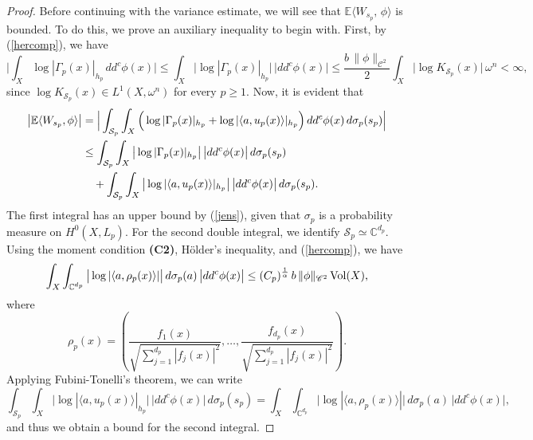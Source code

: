 \documentclass[11pt,leqno,oneside]{amsart}
\numberwithin{equation}{section}
\begin{document}
\begin{proof}
Before continuing with the variance estimate, we will see that \( \mathbb{E}\langle W_{s_{p}}, \, \phi \rangle \) is bounded. To do this, we prove an auxiliary inequality to begin with. First, by (\ref{hercomp}), we have
\begin{equation} \label{jens}
  \Big| \int_{X}{\log{|\Gamma_{p}(x)|_{h_{p}}} \,dd^{c}\phi(x)} \Big| \leq
	\int_{X}{\big|\log{|\Gamma_{p}(x)|_{h_{p}}}\big| \, \big|dd^{c}\phi(x) \big|} \leq \frac{b \, \| \phi \|_{\mathscr{C}^{2}}}{2} \int_{X}{\big|\log{K_{\mathcal{S}_{p}}(x)}\big| \,\omega^{n}} < \infty,
\end{equation}
since \( \log{K_{\mathcal{S}_{p}}(x)} \in L^{1}(X, \omega^{n}) \) for every \( p \geq 1 \). Now, it is evident that
\begin{align} \label{3..6}
	\big{|} \mathbb{E}\langle W_{s_{p}}, \phi \rangle \big{|} &= \Big| \int_{\mathcal{S}_{p}} \int_{X}{\Big(\log{|\Gamma_{p}(x)|_{h_{p}}} + \log{| \langle a, u_{p}(x)\rangle|_{h_{p}}}\Big)} \, dd^{c}\phi(x) \, d\sigma_{p}(s_{p}) \Big| \\ \nonumber 
	&\leq \int_{\mathcal{S}_{p}} \int_{X}{\big|\log{|\Gamma_{p}(x)|_{h_{p}}}\big| \, \big| dd^{c}\phi(x) \big| \, d\sigma_{p}(s_{p})} \\ \nonumber
	&\quad + \int_{\mathcal{S}_{p}} \int_{X}{\big| \log{| \langle a, u_{p}(x)\rangle|_{h_{p}}}\big|} \, \big| dd^{c}\phi(x) \big| \, d\sigma_{p}(s_{p}). \nonumber
\end{align}
 The first integral has an upper bound by (\ref{jens}), given that \(\sigma_{p}\) is a probability measure on \(H^{0}(X, L_{p})\). For the second double integral, we identify \(\mathcal{S}_{p}\simeq\mathbb{C}^{d_{p}}\). Using the moment condition \textbf{(C2)}, H\"{o}lder's inequality, and (\ref{hercomp}), we have
 \begin{equation} \label{2010}
 	\int_{X}\int_{\mathbb{C}^{d_{p}}}{\big{|}\log{| \langle a, \rho_{p}(x)\rangle|}\big{|}} \, d\sigma_{p}(a) \, \big| dd^{c}\phi(x) \big| \leq (C_{p})^{\frac{1}{\alpha}} \, b \, \| \phi \|_{\mathscr{C}^{2}} \, \mathrm{Vol}(X),
 	\end{equation}
 where
 $$\rho_{p}(x) = \left( \frac{f_{1}(x)}{\sqrt{\sum_{j=1}^{d_{p}}{|f_{j}(x)|^{2}}}}, \ldots, \frac{f_{d_{p}}(x)}{\sqrt{\sum_{j=1}^{d_{p}}{|f_{j}(x)|^{2}}}} \right). $$
 Applying Fubini-Tonelli’s theorem, we can write
 \begin{equation}\label{seci}
 	\int_{\mathcal{S}_{p}}\int_{X}{\big| \log{| \langle a, u_{p}(x)\rangle|_{h_{p}}} \big|} \, \big| dd^{c}\phi(x) \big| \, d\sigma_{p}(s_{p}) = \int_{X}\int_{\mathbb{C}^{d_{p}}}{\big| \log{| \langle a, \rho_{p}(x)\rangle|} \big|} \, d\sigma_{p}(a) \, \big| dd^{c}\phi(x) \big|,
 \end{equation}
 and thus we obtain a bound for the second integral.


\end{proof}
\end{document}

